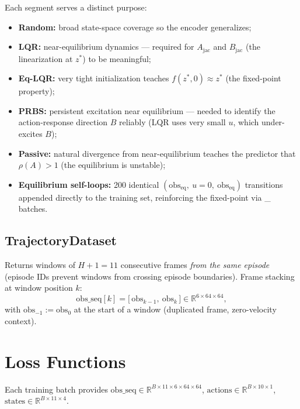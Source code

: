 \documentclass[11pt]{article}
\newcommand{\R}{\mathbb{R}}
\newcommand{\loss}[1]{\mathcal{L}_{\text{#1}}}
\newcommand{\zstar}{z^{*}}
\begin{document}
Each segment serves a distinct purpose:
\begin{itemize}[leftmargin=2em]
  \item \textbf{Random:} broad state-space coverage so the encoder generalizes;
  \item \textbf{LQR:} near-equilibrium dynamics --- required for $A_{\text{jac}}$
        and $B_{\text{jac}}$ (the linearization at $\zstar$) to be meaningful;
  \item \textbf{Eq-LQR:} very tight initialization teaches
        $f(\zstar, 0) \approx \zstar$ (the fixed-point property);
  \item \textbf{PRBS:} persistent excitation near equilibrium --- needed to
        identify the action-response direction $B$ reliably (LQR uses very
        small $u$, which under-excites $B$);
  \item \textbf{Passive:} natural divergence from near-equilibrium teaches the
        predictor that $\rho(A) > 1$ (the equilibrium is unstable);
  \item \textbf{Equilibrium self-loops:} 200 identical
        $(\text{obs}_{\text{eq}},\ u{=}0,\ \text{obs}_{\text{eq}})$ transitions
        appended directly to the training set, reinforcing the fixed-point via
        \loss{pred} batches.
\end{itemize}

\subsection{TrajectoryDataset}

Returns windows of $H{+}1 = 11$ consecutive frames \emph{from the same episode}
(episode IDs prevent windows from crossing episode boundaries). Frame stacking
at window position $k$:
\begin{equation}
\text{obs\_seq}[k] = \big[\,\text{obs}_{k-1},\ \text{obs}_k\,\big] \in \R^{6 \times 64 \times 64},
\end{equation}
with $\text{obs}_{-1} := \text{obs}_0$ at the start of a window (duplicated frame,
zero-velocity context).

\section{Loss Functions}

Each training batch provides
$\text{obs\_seq} \in \R^{B \times 11 \times 6 \times 64 \times 64}$,
$\text{actions} \in \R^{B \times 10 \times 1}$,
$\text{states} \in \R^{B \times 11 \times 4}$.
\end{document}
